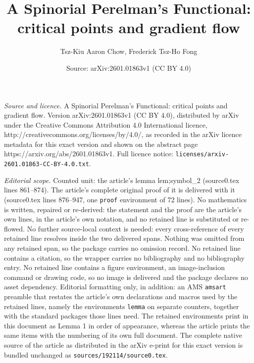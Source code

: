 \documentclass[10pt,a4paper]{amsart}
\title{A Spinorial Perelman's Functional: critical points and gradient flow}
\author{Tsz-Kiu Aaron Chow, Frederick Tsz-Ho Fong}
\date{Source: arXiv:2601.01863v1 (CC BY 4.0)}
\begin{document}
\maketitle

\noindent\emph{Source and licence.} A Spinorial Perelman's Functional: critical points and gradient flow. Version arXiv:2601.01863v1 (CC BY 4.0), distributed by arXiv under the Creative Commons Attribution 4.0 International licence, http://creativecommons.org/licenses/by/4.0/, as recorded in the arXiv licence metadata for this exact version and shown on the abstract page https://arxiv.org/abs/2601.01863v1. Full licence notice: \texttt{licenses/arxiv-2601.01863-CC-BY-4.0.txt}.\par\smallskip

\noindent\textit{Editorial scope.} Counted unit: the article's lemma lem;symbol\_2 (source0.tex lines 861--874). The article's complete original proof of it is delivered with it (source0.tex lines 876--947, one \texttt{proof} environment of 72 lines). No mathematics is written, repaired or re-derived: the statement and the proof are the article's own lines, in the article's own notation, and no retained line is substituted or re-flowed.  No further source-local context is needed: every cross-reference of every retained line resolves inside the two delivered spans.  Nothing was omitted from any retained span, so the package carries no omission record.  No retained line contains a citation, so the wrapper carries no bibliography and no bibliography entry.  No retained line contains a figure environment, an image-inclusion command or drawing code, so no image is delivered and the package declares no asset dependency.  Editorial formatting only, in addition: an AMS \texttt{amsart} preamble that restates the article's own declarations and macros used by the retained lines, namely the environments \texttt{lemma} on separate counters, together with the standard packages those lines need.  The retained environments print in this document as Lemma 1 in order of appearance, whereas the article prints the same items with the numbering of its own full document.  The complete native source of the article as distributed in the arXiv e-print for this exact version is bundled unchanged as \texttt{sources/192114/source0.tex}.
\end{document}
